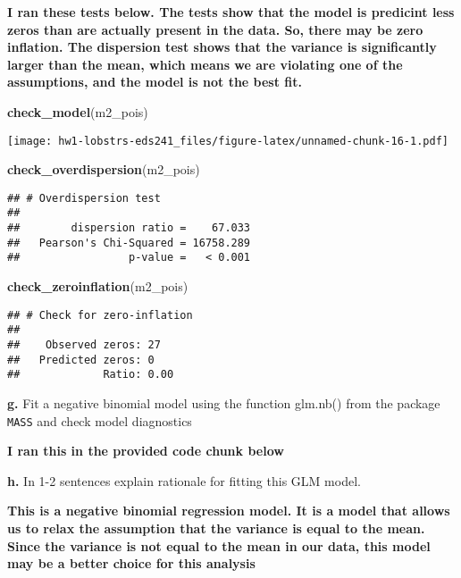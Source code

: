\documentclass[
]{article}
\newenvironment{Shaded}{\begin{snugshade}}{\end{snugshade}}
\newcommand{\FunctionTok}[1]{\textcolor[rgb]{0.13,0.29,0.53}{\textbf{#1}}}
\newcommand{\NormalTok}[1]{#1}
\begin{document}
\textbf{I ran these tests below. The tests show that the model is
predicint less zeros than are actually present in the data. So, there
may be zero inflation. The dispersion test shows that the variance is
significantly larger than the mean, which means we are violating one of
the assumptions, and the model is not the best fit.}

\begin{Shaded}
\begin{Highlighting}[]
\FunctionTok{check\_model}\NormalTok{(m2\_pois)}
\end{Highlighting}
\end{Shaded}

\texttt{[image: hw1-lobstrs-eds241\_files/figure-latex/unnamed-chunk-16-1.pdf]}

\begin{Shaded}
\begin{Highlighting}[]
\FunctionTok{check\_overdispersion}\NormalTok{(m2\_pois)}
\end{Highlighting}
\end{Shaded}

\begin{verbatim}
## # Overdispersion test
## 
##        dispersion ratio =    67.033
##   Pearson's Chi-Squared = 16758.289
##                 p-value =   < 0.001
\end{verbatim}

\begin{Shaded}
\begin{Highlighting}[]
\FunctionTok{check\_zeroinflation}\NormalTok{(m2\_pois)}
\end{Highlighting}
\end{Shaded}

\begin{verbatim}
## # Check for zero-inflation
## 
##    Observed zeros: 27
##   Predicted zeros: 0
##             Ratio: 0.00
\end{verbatim}

\textbf{g.} Fit a negative binomial model using the function glm.nb()
from the package \texttt{MASS} and check model diagnostics

\textbf{I ran this in the provided code chunk below}

\textbf{h.} In 1-2 sentences explain rationale for fitting this GLM
model.

\textbf{This is a negative binomial regression model. It is a model that
allows us to relax the assumption that the variance is equal to the
mean. Since the variance is not equal to the mean in our data, this
model may be a better choice for this analysis}
\end{document}

